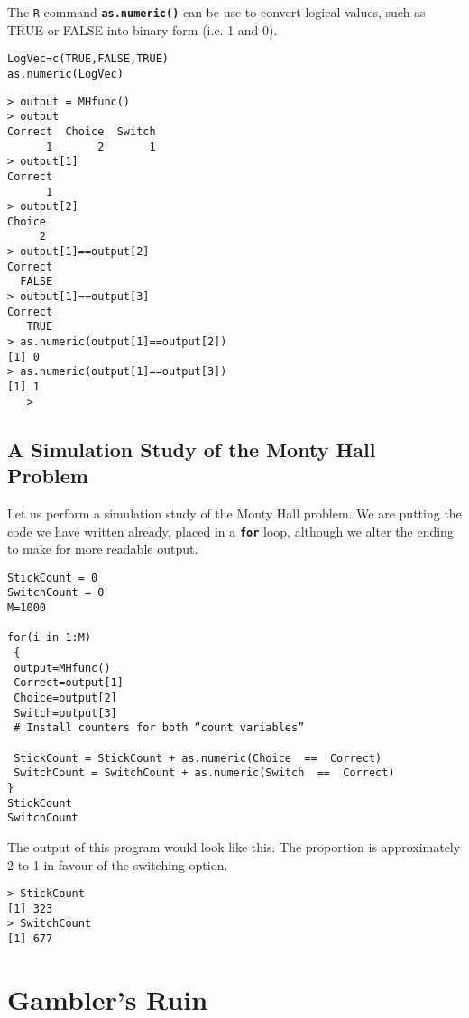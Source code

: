 The \texttt{R} command \texttt{\textbf{as.numeric()}} can be use to convert logical values, such as TRUE or FALSE into binary form (i.e. 1 and 0).

\begin{framed}
\begin{verbatim}
LogVec=c(TRUE,FALSE,TRUE)
as.numeric(LogVec)
\end{verbatim}
\end{framed}
\begin{verbatim}
> output = MHfunc()
> output
Correct  Choice  Switch
      1       2       1
> output[1]
Correct
      1
> output[2]
Choice
     2
> output[1]==output[2]
Correct
  FALSE
> output[1]==output[3]
Correct
   TRUE
> as.numeric(output[1]==output[2])
[1] 0
> as.numeric(output[1]==output[3])
[1] 1
   >
\end{verbatim}

\subsection{A Simulation Study of the Monty Hall Problem}

Let us perform a simulation study of the Monty Hall problem. We are putting the code we have written already, placed in a \texttt{\textbf{for}} loop, although we alter the ending to make for more readable output.

\begin{framed}
\begin{verbatim}
StickCount = 0
SwitchCount = 0
M=1000

for(i in 1:M)
 {
 output=MHfunc()
 Correct=output[1]
 Choice=output[2]
 Switch=output[3]
 # Install counters for both “count variables”

 StickCount = StickCount + as.numeric(Choice  ==  Correct)
 SwitchCount = SwitchCount + as.numeric(Switch  ==  Correct)
}
StickCount
SwitchCount
\end{verbatim}
\end{framed}

The output of this program would look like this. The proportion is approximately 2 to 1 in favour of the switching option.
\begin{verbatim}
> StickCount
[1] 323
> SwitchCount
[1] 677
\end{verbatim}
\newpage
\section{Gambler's Ruin}

